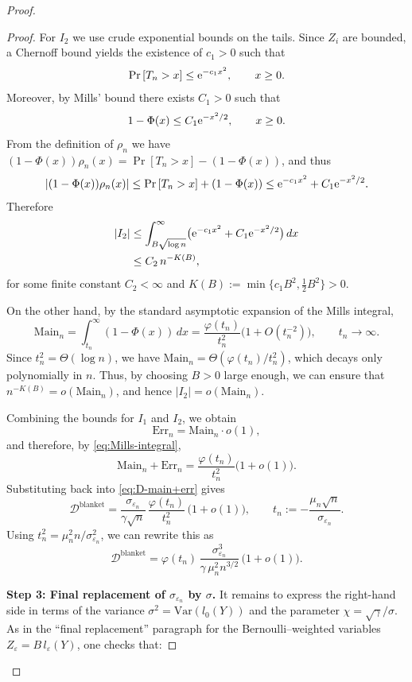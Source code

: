 \documentclass{article}
\theoremstyle{plain}
\theoremstyle{definition}
\begin{document}
\begin{proof}
\begin{proof}
For $I_2$ we use crude exponential bounds on the tails.
Since $Z_i$ are bounded, a Chernoff bound yields the existence of
$c_1>0$ such that
\[
  \Pr\left[T_n>x\right] \le {\rm e}^{-c_1 x^2},
  \qquad x\ge0.
\]
Moreover, by Mills' bound there exists $C_1>0$ such that
\[
  1-\Phi(x) \le C_1 {\rm e}^{-x^2/2},
  \qquad x\ge0.
\]
From the definition of $\rho_n$ we have
\(
  (1-\Phi(x))\rho_n(x)
  = \Pr\left[T_n>x\right] - (1-\Phi(x))
\),
and thus
\[
  |(1-\Phi(x))\rho_n(x)|
  \le \Pr\left[T_n>x\right] + (1-\Phi(x))
  \le {\rm e}^{-c_1 x^2} + C_1 {\rm e}^{-x^2/2}.
\]
Therefore
\begin{align*}
  |I_2|
  &\le \int_{B\sqrt{\log n}}^\infty
          \bigl({\rm e}^{-c_1 x^2} + C_1{\rm e}^{-x^2/2}\bigr)\,dx\\
  &\le C_2\, n^{-K(B)},
\end{align*}
for some finite constant $C_2<\infty$ and
$K(B):=\min\{c_1 B^2,\tfrac12 B^2\}>0$.

On the other hand, by the standard asymptotic expansion of the Mills
integral,
\begin{equation}
  \label{eq:Mills-integral}
  \mathrm{Main}_n
  = \int_{t_n}^\infty (1-\Phi(x))\,dx
  = \frac{\varphi(t_n)}{t_n^2}\bigl(1+O(t_n^{-2})\bigr),
  \qquad t_n\to\infty.
\end{equation}
Since $t_n^2 = \Theta(\log n)$, we have
\(
  \mathrm{Main}_n
  = \Theta(\varphi(t_n)/t_n^2)
\),
which decays only polynomially in $n$. Thus, by choosing $B>0$ large
enough, we can ensure that $n^{-K(B)} = o(\mathrm{Main}_n)$, and hence
$|I_2| = o(\mathrm{Main}_n)$.

Combining the bounds for $I_1$ and $I_2$, we obtain
\[
  \mathrm{Err}_n
  = \mathrm{Main}_n\cdot o(1),
\]
and therefore, by \eqref{eq:Mills-integral},
\[
  \mathrm{Main}_n + \mathrm{Err}_n
  = \frac{\varphi(t_n)}{t_n^2}\bigl(1+o(1)\bigr).
\]
Substituting back into \eqref{eq:D-main+err} gives
\begin{equation}
  \label{eq:D-blanket-pre-final}
  \mathcal D^{\mathrm{blanket}}
  = \frac{\sigma_{\varepsilon_n}}{\gamma\sqrt{n}}\,
    \frac{\varphi(t_n)}{t_n^2}\,
    \bigl(1+o(1)\bigr),
  \qquad
  t_n := -\frac{\mu_n\sqrt{n}}{\sigma_{\varepsilon_n}}.
\end{equation}
Using $t_n^2 = \mu_n^2 n/\sigma_{\varepsilon_n}^2$, we can rewrite this
as
\[
  \mathcal D^{\mathrm{blanket}}
  = \varphi(t_n)\,
    \frac{\sigma_{\varepsilon_n}^3}
         {\gamma\,\mu_n^2 n^{3/2}}\,
    \bigl(1+o(1)\bigr).
\]

\medskip\noindent
\textbf{Step 3: Final replacement of $\sigma_{\varepsilon_n}$ by $\sigma$.}
It remains to express the right-hand side in terms of the variance
$\sigma^2 = \mathrm{Var}(l_0(Y))$ and the parameter
$\chi=\sqrt{\gamma}/\sigma$. As in the ``final replacement'' paragraph
for the Bernoulli–weighted variables $Z_\varepsilon=B\,l_\varepsilon(Y)$,
one checks that:


\end{proof}
\end{proof}
\end{document}
